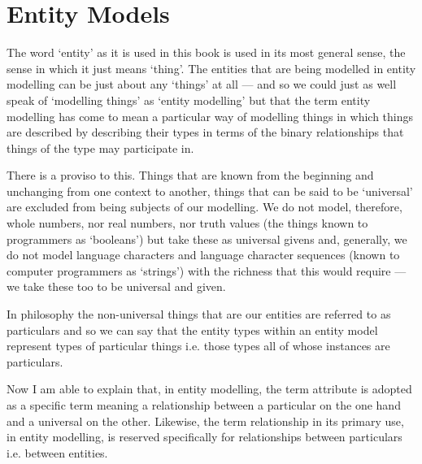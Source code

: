 

\section{Entity Models}
\label{EntityModels}
\mynote The word `entity' as it is used in this book is used in its most general sense,  the sense in which it just means `thing'. The entities that are being modelled in entity modelling can be just about any `things' at all --- and so we could just as well speak of `modelling things' as `entity modelling' but that the term entity modelling
has come to mean a particular way of modelling things in which things are described by describing their types in terms of the binary relationships that things of the type may participate in.

\mynote There is a proviso to this. 
Things that are known from the beginning and unchanging from one context to another, things that can be said to be `universal' are excluded from being subjects of our modelling. We do not model, therefore, whole numbers, nor real numbers, nor truth values 
(the things known to programmers as `booleans') but take these as universal givens and, generally, 
we do not model language characters and language character sequences 
(known to computer programmers as `strings') with the richness that this would require --- we take these too to be universal and given. 

\mynote In philosophy the non-universal things that are our entities are referred to as particulars and so we can say that the entity types within an entity model represent types of particular things i.e. those types all of whose instances are particulars.  

\mynote Now I am able to explain that, in entity modelling, the term attribute is adopted as a specific term meaning a relationship between a particular on the one hand and a universal on the other. Likewise, the term relationship 
in its primary use, in entity modelling, is reserved specifically for relationships between particulars i.e. between entities. 

